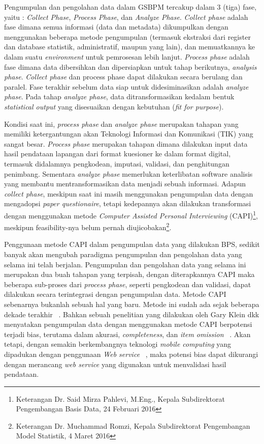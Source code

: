 Pengumpulan dan pengolahan data dalam GSBPM tercakup dalam 3 (tiga) fase, yaitu : \textit{Collect Phase}, \textit{Process Phase}, dan \textit{Analyze Phase}. \textit{Collect phase} adalah fase dimana semua informasi (data dan metadata) dikumpulkan dengan menggunakan beberapa metode pengumpulan (termasuk ekstraksi dari register dan database statistik, administratif, maupun yang lain), dan memuatkannya ke dalam suatu \textit{environment} untuk pemrosesan lebih lanjut. \textit{Process phase} adalah fase dimana data dibersihkan dan dipersiapkan untuk tahap berikutnya, \textit{analysis phase}. \textit{Collect phase} dan process phase dapat dilakukan secara berulang dan paralel. Fase terakhir sebelum data siap untuk didesiminasikan adalah \textit{analyze phase}. Pada tahap \textit{analyze phase}, data ditransformasikan kedalam bentuk \textit{statistical output} yang disesuaikan dengan kebutuhan (\textit{fit for purpose}).

Kondisi saat ini, \textit{process phase} dan \textit{analyze phase} merupakan tahapan yang memiliki ketergantungan akan Teknologi Informasi dan Komunikasi (TIK) yang sangat besar. \textit{Process phase} merupakan tahapan dimana dilakukan input data hasil pendataan lapangan dari format kuesioner ke dalam format digital, termasuk didalamnya pengkodean, imputasi, validasi, dan penghitungan penimbang. Sementara \textit{analyze phase} memerlukan keterlibatan software analisis yang membantu mentransformasikan data menjadi sebuah informasi. Adapun \textit{collect phase}, meskipun saat ini masih menggunakan pengumpulan data dengan mengadopsi \textit{paper questionaire}, tetapi kedepannya akan dilakukan transformasi dengan menggunakan metode \textit{Computer Assisted Personal Interviewing} (CAPI)\footnote{Keterangan Dr. Said Mirza Pahlevi, M.Eng., Kepala Subdirektorat Pengembangan Basis Data, 24 Februari 2016}, meskipun feasibility-nya belum pernah diujicobakan\footnote{Keterangan Dr. Muchammad Romzi, Kepala Subdirektorat Pengembangan Model Statistik, 4 Maret 2016}. 

Penggunaan metode CAPI dalam pengumpulan data yang dilakukan BPS, sedikit banyak akan mengubah paradigma pengumpulan dan pengolahan data yang selama ini telah berjalan. Pengumpulan dan pengolahan data yang selama ini merupakan dua buah tahapan yang terpisah, dengan diterapkannya CAPI maka beberapa sub-proses dari \textit{process phase}, seperti pengkodean dan validasi, dapat dilakukan secara terintegrasi dengan pengumpulan data. Metode CAPI sebenarnya bukanlah sebuah hal yang baru. Metode ini sudah ada sejak beberapa dekade terakhir ~\cite{_redesigning_????}. Bahkan sebuah penelitian yang dilakukan oleh Gary Klein dkk menyatakan pengumpulan data dengan menggunakan metode CAPI berpotensi terjadi bias, terutama dalam akurasi, \textit{completeness}, dan \textit{item omission} ~\cite{klein_bias_1996}. Akan tetapi, dengan semakin berkembangnya teknologi \textit{mobile computing} yang dipadukan dengan penggunaan \textit{Web service} ~\cite{tergujeff_mobile_2007}, maka potensi bias dapat dikurangi dengan merancang \textit{web service} yang digunakan untuk menvalidasi hasil pendataan.

